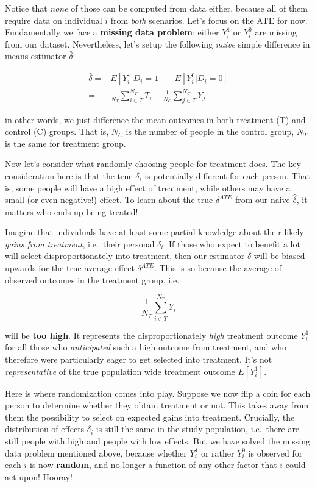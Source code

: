 \documentclass[]{book}
\begin{document}
Notice that \emph{none} of those can be computed from data either, because all of them require data on individual \(i\) from \emph{both} scenarios. Let's focus on the ATE for now. Fundamentally we face a \textbf{missing data problem}: either \(Y_i^1\) or \(Y_i^0\) are missing from our dataset. Nevertheless, let's setup the following \emph{naive} simple difference in means estimator \(\hat{\delta}\):

\begin{align}
\hat{\delta} =& E[Y_i^1|D_i = 1] - E[Y_i^0|D_i = 0]\\
             =& \frac{1}{N_T} \sum_{i \in T}^{N_T} T_i - \frac{1}{N_C} \sum_{j \in T}^{N_C} Y_j \label{eq:SDO}
\end{align}

in other words, we just difference the mean outcomes in both treatment (T) and control (C) groups. That is, \(N_C\) is the number of people in the control group, \(N_T\) is the same for treatment group.

Now let's consider what randomly choosing people for treatment does. The key consideration here is that the true \(\delta_i\) is potentially different for each person. That is, some people will have a high effect of treatment, while others may have a small (or even negative!) effect. To learn about the true \(\delta^{ATE}\) from our naive \(\hat{\delta}\), it matters who ends up being treated!

Imagine that individuals have at least some partial knowledge about their likely \emph{gains from treatment}, i.e.~their personal \(\delta_i\). If those who expect to benefit a lot will select disproportionately into treatment, then our estimator \(\hat{\delta}\) will be biased upwards for the true average effect \(\delta^{ATE}\). This is so because the average of observed outcomes in the treatment group, i.e.

\[
\frac{1}{N_T} \sum_{i \in T}^{N_T} Y_i
\]

will be \textbf{too high}. It represents the disproportionately \emph{high} treatment outcome \(Y_i^1\) for all those who \emph{anticipated} such a high outcome from treatment, and who therefore were particularly eager to get selected into treatment. It's not \emph{representative} of the true population wide treatment outcome \(E[Y_i^1]\).

Here is where randomization comes into play. Suppose we now flip a coin for each person to determine whether they obtain treatment or not. This takes away from them the possibility to select on expected gains into treatment. Crucially, the distribution of effects \(\delta_i\) is still the same in the study population, i.e.~there are still people with high and people with low effects. But we have solved the missing data problem mentioned above, because whether \(Y_i^1\) or rather \(Y_i^0\) is observed for each \(i\) is now \textbf{random}, and no longer a function of any other factor that \(i\) could act upon! Hooray!
\end{document}
